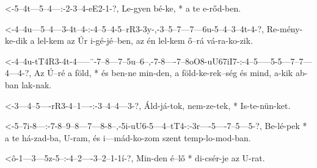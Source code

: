


  {<-5--4t---5--4---:-2-3--4-eE2-1-?,}
  {  Le-gyen bé-ke, * a te e-rőd-ben.}

  {<-4--4u---5--4---3-4t--4-:-4--5--4-5--rR3-3y-,-3--5--7---7---6u-5--4--3--4t-4-?,}
  {  Re-mény-ke-dik a lel-kem az Úr i-gé-jé--ben, az én lel-kem ő--rá vá-ra-ko-zik.}




  {<-4--4u-tT4R3-4t-4-----¨-7--8---7--5u--6--,-7-8----7--8oO8-uU67iI7-:-4--5-----5-5---7--7---4---4-?,}
  {  Az Ú--ré    a  föld, * és ben-ne min-den, a föld-ke-rek--ség       és mind, a-kik ab-ban lak-nak.}

  {<-3---4--5----rR3-4--1----:-3--4--4---3-?,}
  {  Áld-já-tok, nem-ze-tek, * Is-te-nün-ket.}

  {<-5--7i-8---:-7-8--9--8---7---8-8--,-5i-uU6-5---4--tT4-:-3r----5----7--5---5-?,}
  {  Be-lé-pek * a te há-zad-ba, U-ram, és i---mád-ko-zom   szent temp-lo-mod-ban.}


  {<ô-1---3---5z-5--:-4--2----3--2--1-1í-?,}
  {   Min-den é--lő * di-csér-je az U-rat.}


